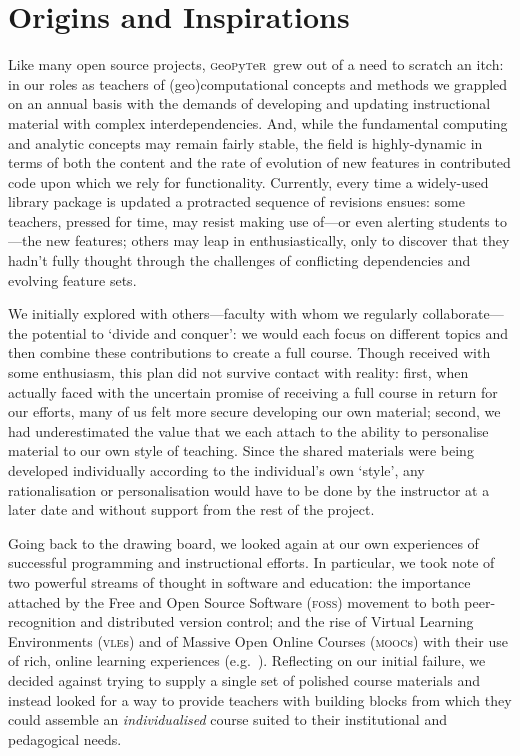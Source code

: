 \documentclass[letter, 11pt,titlepage]{article}
\newcommand{\gp}{\textsc{g}eo\textsc{p}y\textsc{t}e\textsc{r}~\/}
\newcommand{\eg}{e.g.~\/}
\begin{document}
\section{Origins and Inspirations}\label{origins-and-inspirations}

Like many open source projects, \gp grew out of a need to scratch an itch: in
our roles as teachers of (geo)computational concepts and methods we grappled on
an annual basis with the demands of developing and updating instructional
material with complex interdependencies. And, while the fundamental computing
and analytic concepts may remain fairly stable, the field is highly-dynamic in
terms of both the content and the rate of evolution of new features in
contributed code upon which we rely for functionality. Currently, every time a
widely-used library package is updated a protracted sequence of revisions
ensues: some teachers, pressed for time, may resist making use of---or even
alerting students to---the new features; others may leap in enthusiastically,
only to discover that they hadn't fully thought through the challenges of
conflicting dependencies and evolving feature sets.

We initially explored with others---faculty with whom we regularly
collaborate---the potential to `divide and conquer': we would each focus on
different topics and then combine these contributions to create a full course.
Though received with some enthusiasm, this plan did not survive contact with
reality: first, when actually faced with the uncertain promise of receiving a
full course in return for our efforts, many of us felt more secure developing
our own material; second, we had underestimated the value that we each attach to
the ability to personalise material to our own style of teaching. Since the
shared materials were being developed individually according to the individual's
own `style', any rationalisation or personalisation would have to be done by the
instructor at a later date and without support from the rest of the project.

Going back to the drawing board, we looked again at our own experiences of
successful programming and instructional efforts. In particular, we took note of
two powerful streams of thought in software and education: the importance
attached by the Free and Open Source Software (\textsc{foss}) movement to both
peer-recognition \citep{raymond_cathedral_1999} and distributed version control;
and the rise of Virtual Learning Environments (\textsc{vle}s) and of Massive
Open Online Courses (\textsc{mooc}s) with their use of rich, online learning
experiences (\eg \citealp{Trafford2011,Cabiria2012}). Reflecting on our initial
failure, we decided against trying to supply a single set of polished course
materials and instead looked for a way to provide teachers with building blocks
from which they could assemble an \textit{individualised} course suited to their
institutional and pedagogical needs.
\end{document}
